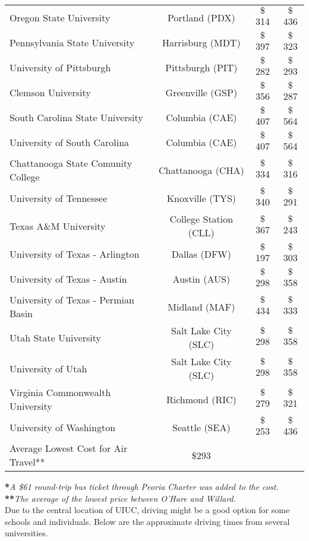 \begin{center}
\begin{tabular}{lccc}
    Oregon State University &Portland (PDX) &$\$$314 &$\$$436 \\ 
    Pennsylvania State University & Harrisburg (MDT)&$\$$397 & $\$$323 \\
    University of Pittsburgh &Pittsburgh (PIT) &$\$$282 &$\$$293 \\ 
    Clemson University&Greenville (GSP)&$\$$356&$\$$287\\
    South Carolina State University&Columbia (CAE)&$\$$407 &$\$$564 \\ 
    University of South Carolina&Columbia (CAE)&$\$$407&$\$$564\\
    Chattanooga State Comunity College&Chattanooga (CHA)&$\$$334&$\$$316\\
    University of Tennessee&Knoxville (TYS)&$\$$340&$\$$291\\
    Texas A\&M University&College Station (CLL)&$\$$367&$\$$243\\
    University of Texas - Arlington&Dallas (DFW)&$\$$197&$\$$303\\
    University of Texas - Austin&Austin (AUS)&$\$$298&$\$$358\\
    University of Texas - Permian Basin&Midland (MAF)&$\$$434&$\$$333\\
    Utah State University&Salt Lake City (SLC)&$\$$298&$\$$358\\
    University of Utah&Salt Lake City (SLC)&$\$$298&$\$$358\\
    Virginia Commonwealth University&Richmond (RIC)&$\$$279&$\$$321\\
    University of Washington&Seattle (SEA)&$\$$253&$\$$436\\
    \hline
    Average Lowest Cost for Air Travel**&$\$$293&&
    \end{tabular} 
\end{center}
\textbf{*}\textit{A \$61 round-trip bus ticket through Peoria Charter was added to the cost.}\\
\textbf{**}\textit{The average of the lowest price between O'Hare and Willard.}\\

Due to the central location of UIUC, driving might be a good option for some schools and individuals. Below are the approximate driving times from several universities. 

